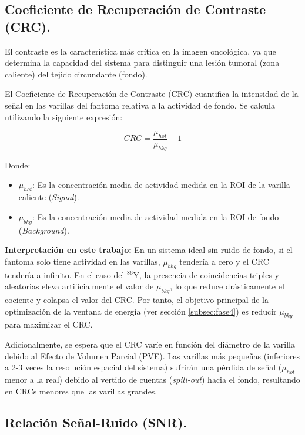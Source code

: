\subsection{Coeficiente de Recuperación de Contraste (CRC).}

El contraste es la característica más crítica en la imagen oncológica, ya que determina la capacidad del sistema para distinguir una lesión tumoral (zona caliente) del tejido circundante (fondo).

El Coeficiente de Recuperación de Contraste (CRC) cuantifica la intensidad de la señal en las varillas del fantoma relativa a la actividad de fondo. Se calcula utilizando la siguiente expresión:

\begin{equation}
  CRC = \frac{\mu_{hot}}{\mu_{bkg}} - 1
  \label{eq:crc}
\end{equation}

Donde:
\begin{itemize}
  \item $\mu_{hot}$: Es la concentración media de actividad medida en la ROI de la varilla caliente (\textit{Signal}).
  \item $\mu_{bkg}$: Es la concentración media de actividad medida en la ROI de fondo (\textit{Background}).
\end{itemize}

\textbf{Interpretación en este trabajo:}
En un sistema ideal sin ruido de fondo, si el fantoma solo tiene actividad en las varillas, $\mu_{bkg}$ tendería a cero y el CRC tendería a infinito.
En el caso del $^{86}\text{Y}$, la presencia de coincidencias triples y aleatorias eleva artificialmente el valor de $\mu_{bkg}$, lo que reduce drásticamente el cociente y colapsa el valor del CRC. Por tanto, el objetivo principal de la optimización de la ventana de energía (ver sección \ref{subsec:fase4}) es reducir $\mu_{bkg}$ para maximizar el CRC.

Adicionalmente, se espera que el CRC varíe en función del diámetro de la varilla debido al Efecto de Volumen Parcial (PVE). Las varillas más pequeñas (inferiores a 2-3 veces la resolución espacial del sistema) sufrirán una pérdida de señal ($\mu_{hot}$ menor a la real) debido al vertido de cuentas (\textit{spill-out}) hacia el fondo, resultando en CRCs menores que las varillas grandes.

\subsection{Relación Señal-Ruido (SNR).}


